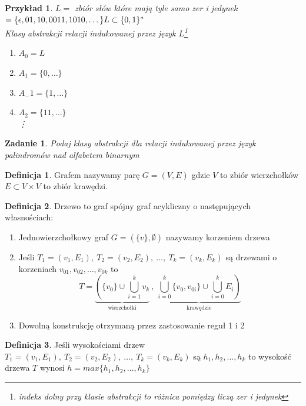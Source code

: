\documentclass[12pt,a4paper]{article}
\newtheorem{przyklad}{Przykład}
\newtheorem{zad}{Zadanie}
\theoremstyle{definition}
\newtheorem{df}{Definicja}
\begin{document}
	\begin{przyklad}
		$L = $ zbiór słów które mają tyle samo zer i jedynek $ = \{\epsilon, 01, 10, 0011, 1010, \dots\}\\
		L \subset \{0, 1\}^*$\\
		Klasy abstrakcji relacji indukowanej przez język $L$\footnote{indeks dolny przy klasie abstrakcji to różnica pomiędzy liczą zer i jedynek}
		\begin{enumerate}
			\item $A_0 = L$
			\item $A_1 = \{0, \dots \}$
			\item $A_-1 = \{1, \dots \}$
			\item $A_2 = \{11, \dots \}$\\
			\vdots
		\end{enumerate}
	\end{przyklad}
	\begin{zad}
		Podaj klasy abstrakcji dla relacji indukowanej przez język palindromów nad alfabetem binarnym
	\end{zad}
	
	\begin{df}
		Grafem nazywamy parę $G = (V, E)$ gdzie $V$ to zbiór wierzchołków $E \subset V \times V$ to zbiór krawędzi.
	\end{df}	

	\begin{df}
		Drzewo to graf spójny graf acykliczny o następujących własnościach:
		\begin{enumerate}
			\item Jednowierzchołkowy graf $G = (\{v\}, \emptyset)$ nazywamy korzeniem drzewa
			\item Jeśli $T_1 = (v_1, E_1), ~ T_2 = (v_2, E_2), ~\dots ,~ T_k = (v_k, E_k)$ są drzewami o korzeniach $v_{01}, v_{02}, \dots, v_{0k}$
			to $$T = \underbrace{ \left(\{v_0\} \cup \bigcup^k_{i=1}v_k \right. }_\text{wierzchołki} ~,~
					\underbrace{ \left. \bigcup_{i=0}^k \{v_0, v_{0i}\} \cup \bigcup_{i=0}^k E_i \right) }_\text{krawędzie}$$
			\item Dowolną konstrukcję otrzymaną przez zastosowanie reguł 1 i 2
		\end{enumerate}			
	\end{df}
	
	\begin{df}
		Jeśli wysokościami drzew $T_1 = (v_1, E_1), ~ T_2 = (v_2, E_2), ~\dots ,~ T_k = (v_k, E_k)$ są $h_1, h_2, \dots , h_k$ to
		wysokość drzewa $T$ wynosi $h = max\{h_1, h_2, \dots , h_k\}$
	\end{df}
	
\end{document}
